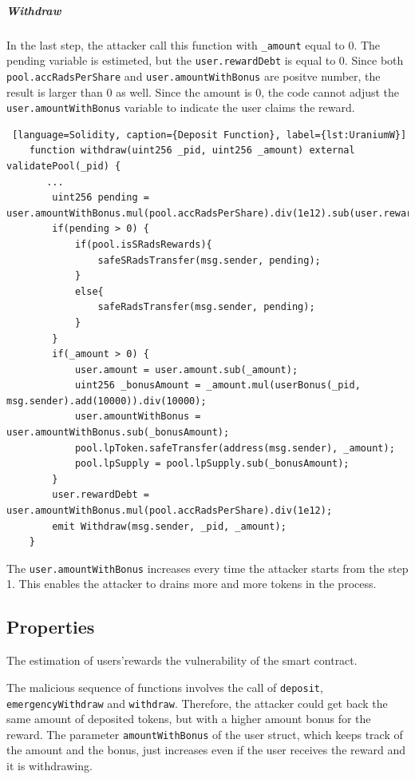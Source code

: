 \subparagraph{Withdraw} In the last step, the attacker call this function with \texttt{\_amount} equal to 0.
The pending variable is estimeted, but the \texttt{user.rewardDebt} is equal to 0.
Since both \texttt{pool.accRadsPerShare} and \texttt{user.amountWithBonus} are positve number, the result is larger than 0 as well.
Since the amount is 0, the code cannot adjust the \texttt{user.amountWithBonus} variable to indicate the user claims the reward.

\begin{lstlisting} [language=Solidity, caption={Deposit Function}, label={lst:UraniumW}]
    function withdraw(uint256 _pid, uint256 _amount) external validatePool(_pid) {
       ...
        uint256 pending = user.amountWithBonus.mul(pool.accRadsPerShare).div(1e12).sub(user.rewardDebt);
        if(pending > 0) {
            if(pool.isSRadsRewards){
                safeSRadsTransfer(msg.sender, pending);
            }
            else{
                safeRadsTransfer(msg.sender, pending);
            }
        }
        if(_amount > 0) {
            user.amount = user.amount.sub(_amount);
            uint256 _bonusAmount = _amount.mul(userBonus(_pid, msg.sender).add(10000)).div(10000);
            user.amountWithBonus = user.amountWithBonus.sub(_bonusAmount);
            pool.lpToken.safeTransfer(address(msg.sender), _amount);
            pool.lpSupply = pool.lpSupply.sub(_bonusAmount);
        }
        user.rewardDebt = user.amountWithBonus.mul(pool.accRadsPerShare).div(1e12);
        emit Withdraw(msg.sender, _pid, _amount);
    }

\end{lstlisting} 

The \texttt{user.amountWithBonus} increases every time the attacker starts from the step 1. 
This enables the attacker to drains more and more tokens in the process. 

\subsection{Properties}
The estimation of users'rewards the vulnerability of the smart contract.

The malicious sequence of functions involves the call of \texttt{deposit}, \texttt{emergencyWithdraw} and \texttt{withdraw}.
Therefore, the attacker could get back the same amount of deposited tokens, but with a higher amount bonus for the reward. 
The parameter \texttt{amountWithBonus} of the user struct, which keeps track of the amount and the bonus, just increases even if the user receives the reward and it is withdrawing. 

